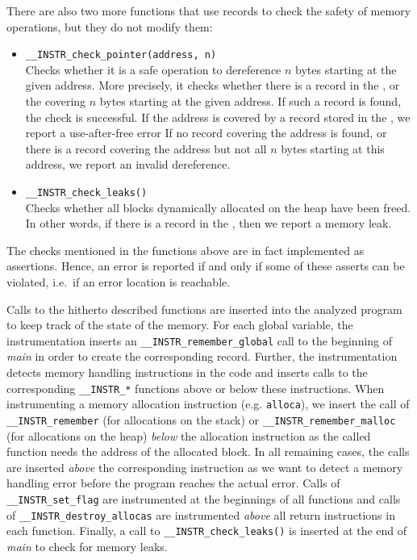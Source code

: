 There are also two more functions that use records to check
the safety of memory operations, but they do not modify them:
\begin{itemize}
\item \texttt{\_\_INSTR\_check\_pointer(address, n)}
  \\Checks whether it is a safe operation to dereference $n$ bytes
  starting at the given address. More precisely, it checks whether
  there is a record in the \stacklist, \heaplist or the \globalslist
  covering $n$ bytes starting at the given address.  If such a record
  is found, the check is successful. If the address is covered by a
  record stored in the \dealloclist, we report a use-after-free error
  If no record covering the address is found, or there is a record
  covering the address but not all $n$ bytes starting at this address,
  we report an invalid dereference.
\item \texttt{\_\_INSTR\_check\_leaks()}
  \\Checks whether all blocks dynamically allocated on the heap have been
  freed. In other words, if there is a record in the \heaplist, then we report
  a memory leak.
\end{itemize}

The checks mentioned in the functions above
are in fact implemented as assertions. Hence, an error is reported if
and only if some of these asserts can be violated, i.e.~if an error
location is reachable.

Calls to the hitherto described functions are inserted into the analyzed
program to keep track of the state of the memory.  For each global variable,
the instrumentation inserts an \texttt{\_\_INSTR\_remember\_global} call to the
beginning of \emph{main} in order to create the corresponding record. Further,
the instrumentation detects memory handling instructions in the code and
inserts calls to the corresponding \texttt{\_\_INSTR\_*} functions above or
below these instructions. When instrumenting a memory allocation instruction
(e.g. \texttt{alloca}), we insert the call of \texttt{\_\_INSTR\_remember} (for
allocations on the stack) or \texttt{\_\_INSTR\_remember\_malloc} (for
allocations on the heap) \emph{below} the allocation instruction as the called
function needs the address of the allocated block. In all remaining cases, the
calls are inserted \emph{above} the corresponding instruction as we want to
detect a memory handling error before the program reaches the actual error.
Calls of \texttt{\_\_INSTR\_set\_flag} are instrumented at the beginnings of
all functions and calls of \texttt{\_\_INSTR\_destroy\_allocas} are
instrumented \emph{above} all return instructions in each function. Finally, a
call to \texttt{\_\_INSTR\_check\_leaks()} is inserted at the end of
\emph{main} to check for memory leaks.

